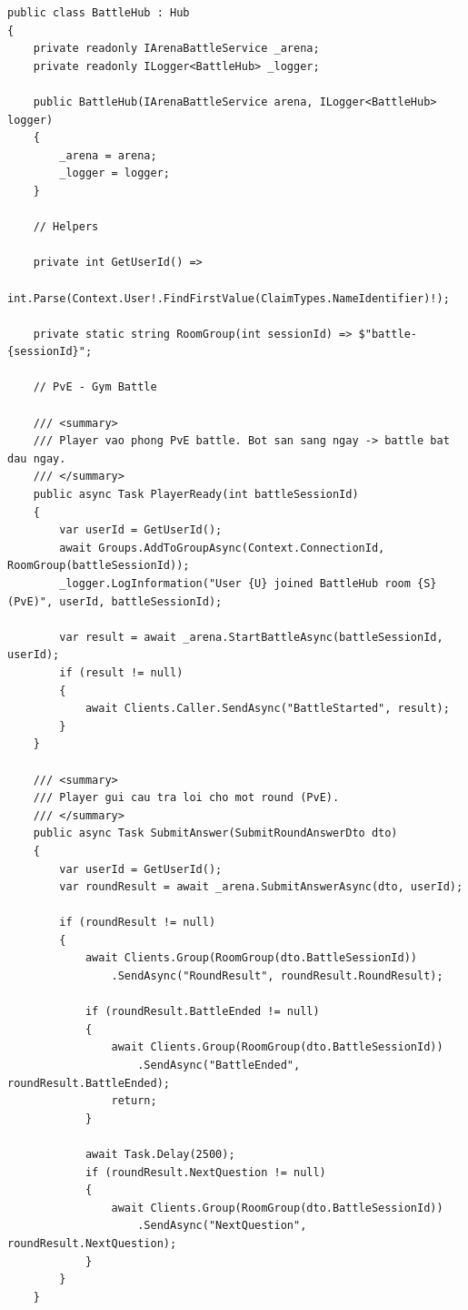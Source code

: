 \begin{lstlisting}[caption={Doan ma xu ly logic chinh trong BattleHub (SignalR)}, label={lst:battlehub}]
public class BattleHub : Hub
{
    private readonly IArenaBattleService _arena;
    private readonly ILogger<BattleHub> _logger;

    public BattleHub(IArenaBattleService arena, ILogger<BattleHub> logger)
    {
        _arena = arena;
        _logger = logger;
    }

    // Helpers

    private int GetUserId() =>
        int.Parse(Context.User!.FindFirstValue(ClaimTypes.NameIdentifier)!);

    private static string RoomGroup(int sessionId) => $"battle-{sessionId}";

    // PvE - Gym Battle

    /// <summary>
    /// Player vao phong PvE battle. Bot san sang ngay -> battle bat dau ngay.
    /// </summary>
    public async Task PlayerReady(int battleSessionId)
    {
        var userId = GetUserId();
        await Groups.AddToGroupAsync(Context.ConnectionId, RoomGroup(battleSessionId));
        _logger.LogInformation("User {U} joined BattleHub room {S} (PvE)", userId, battleSessionId);

        var result = await _arena.StartBattleAsync(battleSessionId, userId);
        if (result != null)
        {
            await Clients.Caller.SendAsync("BattleStarted", result);
        }
    }

    /// <summary>
    /// Player gui cau tra loi cho mot round (PvE).
    /// </summary>
    public async Task SubmitAnswer(SubmitRoundAnswerDto dto)
    {
        var userId = GetUserId();
        var roundResult = await _arena.SubmitAnswerAsync(dto, userId);

        if (roundResult != null)
        {
            await Clients.Group(RoomGroup(dto.BattleSessionId))
                .SendAsync("RoundResult", roundResult.RoundResult);

            if (roundResult.BattleEnded != null)
            {
                await Clients.Group(RoomGroup(dto.BattleSessionId))
                    .SendAsync("BattleEnded", roundResult.BattleEnded);
                return;
            }

            await Task.Delay(2500);
            if (roundResult.NextQuestion != null)
            {
                await Clients.Group(RoomGroup(dto.BattleSessionId))
                    .SendAsync("NextQuestion", roundResult.NextQuestion);
            }
        }
    }


\end{lstlisting}
